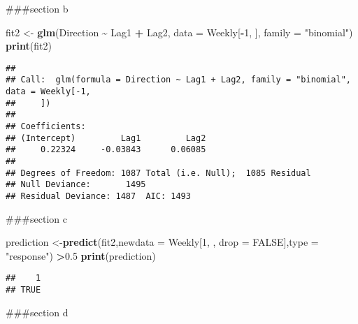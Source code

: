 \documentclass[
]{article}
\newenvironment{Shaded}{\begin{snugshade}}{\end{snugshade}}
\newcommand{\AttributeTok}[1]{\textcolor[rgb]{0.13,0.29,0.53}{#1}}
\newcommand{\ConstantTok}[1]{\textcolor[rgb]{0.56,0.35,0.01}{#1}}
\newcommand{\DecValTok}[1]{\textcolor[rgb]{0.00,0.00,0.81}{#1}}
\newcommand{\FloatTok}[1]{\textcolor[rgb]{0.00,0.00,0.81}{#1}}
\newcommand{\FunctionTok}[1]{\textcolor[rgb]{0.13,0.29,0.53}{\textbf{#1}}}
\newcommand{\NormalTok}[1]{#1}
\newcommand{\OtherTok}[1]{\textcolor[rgb]{0.56,0.35,0.01}{#1}}
\newcommand{\SpecialCharTok}[1]{\textcolor[rgb]{0.81,0.36,0.00}{\textbf{#1}}}
\newcommand{\StringTok}[1]{\textcolor[rgb]{0.31,0.60,0.02}{#1}}
\begin{document}
\#\#\#section b

\begin{Shaded}
\begin{Highlighting}[]
\NormalTok{fit2 }\OtherTok{\textless{}{-}} \FunctionTok{glm}\NormalTok{(Direction }\SpecialCharTok{\textasciitilde{}}\NormalTok{ Lag1 }\SpecialCharTok{+}\NormalTok{ Lag2, }\AttributeTok{data =}\NormalTok{ Weekly[}\SpecialCharTok{{-}}\DecValTok{1}\NormalTok{, ], }\AttributeTok{family =} \StringTok{"binomial"}\NormalTok{)}
\FunctionTok{print}\NormalTok{(fit2)}
\end{Highlighting}
\end{Shaded}

\begin{verbatim}
## 
## Call:  glm(formula = Direction ~ Lag1 + Lag2, family = "binomial", data = Weekly[-1, 
##     ])
## 
## Coefficients:
## (Intercept)         Lag1         Lag2  
##     0.22324     -0.03843      0.06085  
## 
## Degrees of Freedom: 1087 Total (i.e. Null);  1085 Residual
## Null Deviance:       1495 
## Residual Deviance: 1487  AIC: 1493
\end{verbatim}

\#\#\#section c

\begin{Shaded}
\begin{Highlighting}[]
\NormalTok{prediction }\OtherTok{\textless{}{-}}\FunctionTok{predict}\NormalTok{(fit2,}\AttributeTok{newdata =}\NormalTok{ Weekly[}\DecValTok{1}\NormalTok{, , }\AttributeTok{drop =} \ConstantTok{FALSE}\NormalTok{],}\AttributeTok{type =} \StringTok{"response"}\NormalTok{) }\SpecialCharTok{\textgreater{}}\FloatTok{0.5}
\FunctionTok{print}\NormalTok{(prediction)}
\end{Highlighting}
\end{Shaded}

\begin{verbatim}
##    1 
## TRUE
\end{verbatim}

\#\#\#section d
\end{document}
